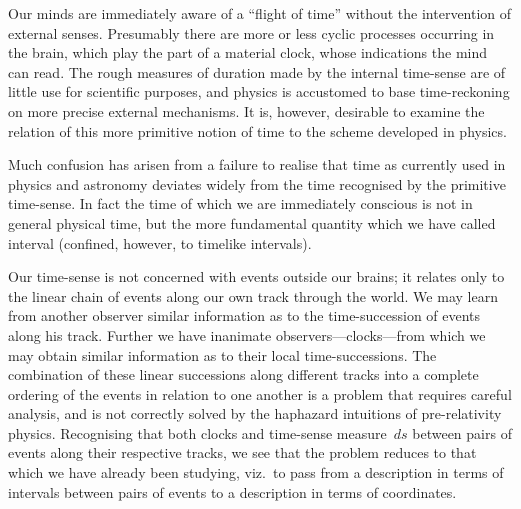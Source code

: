 \documentclass[12pt]{book}
\begin{document}
%

Our minds are immediately aware of a ``flight of time'' without the intervention
of external senses. Presumably there are more or less cyclic processes
occurring in the brain, which play the part of a material clock, whose indications
the mind can read. The rough measures of duration made by the internal
time-sense are of little use for scientific purposes, and physics is accustomed
to base time-reckoning on more precise external mechanisms. It is, however,
desirable to examine the relation of this more primitive notion of time to the
scheme developed in physics.

Much confusion has arisen from a failure to realise that time as currently
used in physics and astronomy deviates widely from the time recognised by
the primitive time-sense. In fact the time of which we are immediately conscious
is not in general physical time, but the more fundamental quantity
which we have called interval (confined, however, to timelike intervals).

Our time-sense is not concerned with events outside our brains; it relates
only to the linear chain of events along our own track through the world. We
may learn from another observer similar information as to the time-succession
of events along his track. Further we have inanimate observers---clocks---from
which we may obtain similar information as to their local time-successions.
The combination of these linear successions along different tracks into a complete
ordering of the events in relation to one another is a problem that
requires careful analysis, and is not correctly solved by the haphazard intuitions
of pre-relativity physics. Recognising that both clocks and time-sense measure~$ds$
between pairs of events along their respective tracks, we see that the
problem reduces to that which we have already been studying, viz.\ to pass
from a description in terms of intervals between pairs of events to a description
in terms of coordinates.
\end{document}
